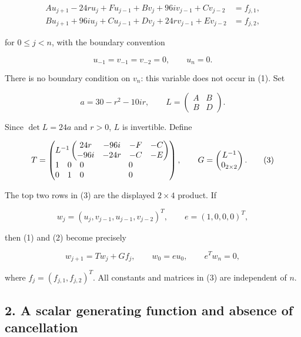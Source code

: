 \documentclass[10pt,a4paper]{article}
\begin{document}
\nopagebreak[4]

\[
\begin{aligned}
A u_{j+1}-24r u_j+F u_{j-1}
 +Bv_j+96iv_{j-1}+Cv_{j-2}&=f_{j,1},\\
B u_{j+1}+96iu_j+C u_{j-1}
 +Dv_j+24rv_{j-1}+Ev_{j-2}&=f_{j,2},
\end{aligned}
\tag{1}
\]

for \(0\le j<n\), with the boundary convention

\nopagebreak[4]

\[
u_{-1}=v_{-1}=v_{-2}=0,\qquad u_n=0.
\tag{2}
\]

There is no boundary condition on \(v_n\): this variable does not occur
in (1). Set

\nopagebreak[4]

\[
a=30-r^2-10ir,\qquad
L=\begin{pmatrix}A&B\\B&D\end{pmatrix}.
\]

Since \(\det L=24a\) and \(r>0\), \(L\) is invertible. Define

\nopagebreak[4]

\[
T=\begin{pmatrix}
\multicolumn{4}{c}{L^{-1}\begin{pmatrix}24r&-96i&-F&-C\\-96i&-24r&-C&-E\end{pmatrix}}\\
1&0&0&0\\
0&1&0&0
\end{pmatrix},
\qquad
G=\begin{pmatrix}L^{-1}\\0_{2\times2}\end{pmatrix}.
\tag{3}
\]


The top two rows in (3) are the displayed \(2\times4\) product. If

\nopagebreak[4]

\[
w_j=(u_j,v_{j-1},u_{j-1},v_{j-2})^T,
\qquad e=(1,0,0,0)^T,
\]

then (1) and (2) become precisely

\nopagebreak[4]

\[
w_{j+1}=Tw_j+Gf_j,\qquad w_0=e u_0,\qquad e^T w_n=0,
\tag{4}
\]

where \(f_j=(f_{j,1},f_{j,2})^T\). All constants and matrices in (3) are
independent of \(n\).

\subsection{2. A scalar generating function and absence of
cancellation}\label{a-scalar-generating-function-and-absence-of-cancellation}
\end{document}
